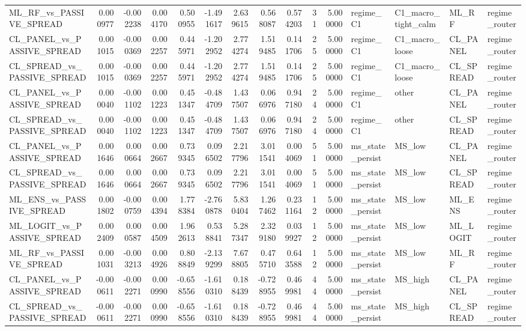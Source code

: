 \begin{table}
\begin{tabular}{lrrrrrrrrrrllll}
ML_RF_vs_PASSIVE_SPREAD & 0.000977 & -0.002238 & 0.004170 & 0.500955 & -1.491617 & 2.639615 & 0.568087 & 0.574203 & 31 & 5.000000 & regime_C1 & C1_macro_tight_calm & ML_RF & regime_router \\
CL_PANEL_vs_PASSIVE_SPREAD & 0.001015 & -0.000369 & 0.002257 & 0.445971 & -1.202952 & 2.774274 & 1.519485 & 0.141706 & 25 & 5.000000 & regime_C1 & C1_macro_loose & CL_PANEL & regime_router \\
CL_SPREAD_vs_PASSIVE_SPREAD & 0.001015 & -0.000369 & 0.002257 & 0.445971 & -1.202952 & 2.774274 & 1.519485 & 0.141706 & 25 & 5.000000 & regime_C1 & C1_macro_loose & CL_SPREAD & regime_router \\
CL_PANEL_vs_PASSIVE_SPREAD & 0.000040 & -0.001102 & 0.001223 & 0.451347 & -0.484709 & 1.437507 & 0.066976 & 0.947180 & 24 & 5.000000 & regime_C1 & other & CL_PANEL & regime_router \\
CL_SPREAD_vs_PASSIVE_SPREAD & 0.000040 & -0.001102 & 0.001223 & 0.451347 & -0.484709 & 1.437507 & 0.066976 & 0.947180 & 24 & 5.000000 & regime_C1 & other & CL_SPREAD & regime_router \\
CL_PANEL_vs_PASSIVE_SPREAD & 0.001646 & 0.000664 & 0.002667 & 0.739345 & 0.096502 & 2.217796 & 3.011541 & 0.004069 & 51 & 5.000000 & ms_state_persist & MS_low & CL_PANEL & regime_router \\
CL_SPREAD_vs_PASSIVE_SPREAD & 0.001646 & 0.000664 & 0.002667 & 0.739345 & 0.096502 & 2.217796 & 3.011541 & 0.004069 & 51 & 5.000000 & ms_state_persist & MS_low & CL_SPREAD & regime_router \\
ML_ENS_vs_PASSIVE_SPREAD & 0.001802 & -0.000759 & 0.004394 & 1.778384 & -2.760878 & 5.830404 & 1.267462 & 0.231164 & 12 & 5.000000 & ms_state_persist & MS_low & ML_ENS & regime_router \\
ML_LOGIT_vs_PASSIVE_SPREAD & 0.002409 & 0.000587 & 0.004509 & 1.962613 & 0.538841 & 5.287347 & 2.329180 & 0.039927 & 12 & 5.000000 & ms_state_persist & MS_low & ML_LOGIT & regime_router \\
ML_RF_vs_PASSIVE_SPREAD & 0.001031 & -0.003213 & 0.004926 & 0.808849 & -2.139299 & 7.678805 & 0.475710 & 0.643588 & 12 & 5.000000 & ms_state_persist & MS_low & ML_RF & regime_router \\
CL_PANEL_vs_PASSIVE_SPREAD & -0.000611 & -0.002271 & 0.000990 & -0.658556 & -1.610310 & 0.188439 & -0.728955 & 0.469981 & 44 & 5.000000 & ms_state_persist & MS_high & CL_PANEL & regime_router \\
CL_SPREAD_vs_PASSIVE_SPREAD & -0.000611 & -0.002271 & 0.000990 & -0.658556 & -1.610310 & 0.188439 & -0.728955 & 0.469981 & 44 & 5.000000 & ms_state_persist & MS_high & CL_SPREAD & regime_router \\

\end{tabular}
\end{table}

